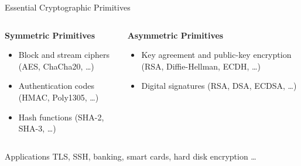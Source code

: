 \documentclass[xcolor=table,10pt,aspectratio=169]{beamer}
\begin{document}
\begin{frame}[label={sec:orgf3e485e}]{Essential Cryptographic Primitives}
\begin{columns}[t]
\begin{column}{0.5\columnwidth}
\textbf{Symmetric Primitives}

\small

\begin{itemize}
\item Block and stream ciphers (AES, ChaCha20, \ldots)
\item Authentication codes (HMAC, Poly1305, \ldots)
\item Hash functions (SHA-2, SHA-3, \ldots)
\end{itemize}
\end{column}

\begin{column}{0.5\columnwidth}
\textbf{Asymmetric Primitives}

\small

\begin{itemize}
\item Key agreement and public-key encryption (RSA, Diffie-Hellman, ECDH, \ldots)
\item Digital signatures (RSA, DSA, ECDSA, \ldots)
\end{itemize}
\end{column}
\end{columns}

\begin{block}{Applications}
TLS, SSH, banking, smart cards, hard disk encryption …
\end{block}

\vspace{7.2em}
\end{frame}
\end{document}
